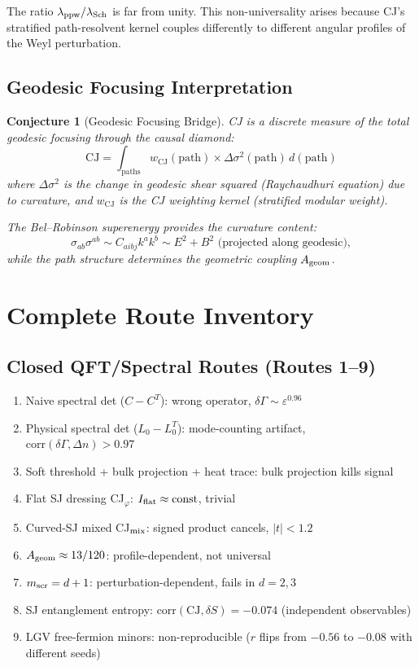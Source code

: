\documentclass[11pt,a4paper]{article}
\newtheorem{conjecture}{Conjecture}
\begin{document}
The ratio $\lambda_{\rm ppw}/\lambda_{\rm Sch}$ is far from unity. This non-universality arises because CJ's stratified path-resolvent kernel couples differently to different angular profiles of the Weyl perturbation.

\subsection{Geodesic Focusing Interpretation}

\begin{conjecture}[Geodesic Focusing Bridge]
CJ is a discrete measure of the total geodesic focusing through the causal diamond:
\begin{equation}
\text{CJ} = \int_{\text{paths}} w_{\text{CJ}}(\text{path}) \times \Delta\sigma^2(\text{path})\, d(\text{path})
\end{equation}
where $\Delta\sigma^2$ is the change in geodesic shear squared (Raychaudhuri equation) due to curvature, and $w_{\text{CJ}}$ is the CJ weighting kernel (stratified modular weight).

The Bel--Robinson superenergy provides the curvature content:
\begin{equation}
\sigma_{ab}\sigma^{ab} \sim C_{aibj} k^a k^b \sim E^2 + B^2 \text{ (projected along geodesic)},
\end{equation}
while the path structure determines the geometric coupling $A_{\rm geom}$.
\end{conjecture}

\section{Complete Route Inventory}

\subsection{Closed QFT/Spectral Routes (Routes 1--9)}

\begin{enumerate}
\item Naive spectral det ($C - C^T$): wrong operator, $\delta\Gamma \sim \varepsilon^{0.96}$
\item Physical spectral det ($L_0 - L_0^T$): mode-counting artifact, $\text{corr}(\delta\Gamma, \Delta n) > 0.97$
\item Soft threshold + bulk projection + heat trace: bulk projection kills signal
\item Flat SJ dressing CJ$_\varphi$: $I_{\rm flat} \approx \text{const}$, trivial
\item Curved-SJ mixed CJ$_{\rm mix}$: signed product cancels, $|t| < 1.2$
\item $A_{\rm geom} \approx 13/120$: profile-dependent, not universal
\item $m_{\rm scr} = d+1$: perturbation-dependent, fails in $d = 2,3$
\item SJ entanglement entropy: $\text{corr}(\text{CJ}, \delta S) = -0.074$ (independent observables)
\item LGV free-fermion minors: non-reproducible ($r$ flips from $-0.56$ to $-0.08$ with different seeds)
\end{enumerate}
\end{document}
